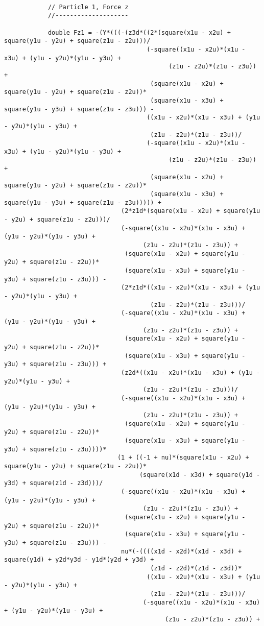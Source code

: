 \begin{lstlisting}
			
			// Particle 1, Force z
			//--------------------
			
			double Fz1 = -(Y*(((-(z3d*((2*(square(x1u - x2u) + square(y1u - y2u) + square(z1u - z2u)))/
									   (-square((x1u - x2u)*(x1u - x3u) + (y1u - y2u)*(y1u - y3u) + 
											 (z1u - z2u)*(z1u - z3u)) + 
										(square(x1u - x2u) + square(y1u - y2u) + square(z1u - z2u))*
										(square(x1u - x3u) + square(y1u - y3u) + square(z1u - z3u))) - 
									   ((x1u - x2u)*(x1u - x3u) + (y1u - y2u)*(y1u - y3u) + 
										(z1u - z2u)*(z1u - z3u))/
									   (-square((x1u - x2u)*(x1u - x3u) + (y1u - y2u)*(y1u - y3u) + 
											 (z1u - z2u)*(z1u - z3u)) + 
										(square(x1u - x2u) + square(y1u - y2u) + square(z1u - z2u))*
										(square(x1u - x3u) + square(y1u - y3u) + square(z1u - z3u))))) + 
								(2*z1d*(square(x1u - x2u) + square(y1u - y2u) + square(z1u - z2u)))/
								(-square((x1u - x2u)*(x1u - x3u) + (y1u - y2u)*(y1u - y3u) + 
									  (z1u - z2u)*(z1u - z3u)) + 
								 (square(x1u - x2u) + square(y1u - y2u) + square(z1u - z2u))*
								 (square(x1u - x3u) + square(y1u - y3u) + square(z1u - z3u))) - 
								(2*z1d*((x1u - x2u)*(x1u - x3u) + (y1u - y2u)*(y1u - y3u) + 
										(z1u - z2u)*(z1u - z3u)))/
								(-square((x1u - x2u)*(x1u - x3u) + (y1u - y2u)*(y1u - y3u) + 
									  (z1u - z2u)*(z1u - z3u)) + 
								 (square(x1u - x2u) + square(y1u - y2u) + square(z1u - z2u))*
								 (square(x1u - x3u) + square(y1u - y3u) + square(z1u - z3u))) + 
								(z2d*((x1u - x2u)*(x1u - x3u) + (y1u - y2u)*(y1u - y3u) + 
									  (z1u - z2u)*(z1u - z3u)))/
								(-square((x1u - x2u)*(x1u - x3u) + (y1u - y2u)*(y1u - y3u) + 
									  (z1u - z2u)*(z1u - z3u)) + 
								 (square(x1u - x2u) + square(y1u - y2u) + square(z1u - z2u))*
								 (square(x1u - x3u) + square(y1u - y3u) + square(z1u - z3u))))*
							   (1 + ((-1 + nu)*(square(x1u - x2u) + square(y1u - y2u) + square(z1u - z2u))*
									 (square(x1d - x3d) + square(y1d - y3d) + square(z1d - z3d)))/
								(-square((x1u - x2u)*(x1u - x3u) + (y1u - y2u)*(y1u - y3u) + 
									  (z1u - z2u)*(z1u - z3u)) + 
								 (square(x1u - x2u) + square(y1u - y2u) + square(z1u - z2u))*
								 (square(x1u - x3u) + square(y1u - y3u) + square(z1u - z3u))) - 
								nu*(-((((x1d - x2d)*(x1d - x3d) + square(y1d) + y2d*y3d - y1d*(y2d + y3d) + 
										(z1d - z2d)*(z1d - z3d))*
									   ((x1u - x2u)*(x1u - x3u) + (y1u - y2u)*(y1u - y3u) + 
										(z1u - z2u)*(z1u - z3u)))/
									  (-square((x1u - x2u)*(x1u - x3u) + (y1u - y2u)*(y1u - y3u) + 
											(z1u - z2u)*(z1u - z3u)) + 

\end{lstlisting}
